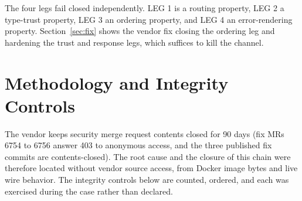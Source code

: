 \documentclass[journal]{IEEEtran}
\begin{document}
The four legs fail closed independently. LEG 1 is a routing property, LEG 2 a
type-trust property, LEG 3 an ordering property, and LEG 4 an error-rendering
property. Section~\ref{sec:fix} shows the vendor fix closing the ordering leg
and hardening the trust and response legs, which suffices to kill the channel.

\section{Methodology and Integrity Controls}
\label{sec:intro-method}
\label{sec:method}

The vendor keeps security merge request contents closed for 90 days (fix MRs
6754 to 6756 answer 403 to anonymous access, and the three published fix
commits are contents-closed). The root cause and the closure of this chain
were therefore located without vendor source access, from Docker image bytes
and live wire behavior. The integrity controls below are counted, ordered, and
each was exercised during the case rather than declared.
\end{document}
